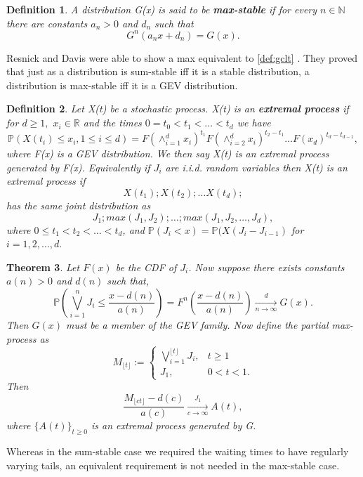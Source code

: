 \documentclass[honours,12pt]{UNSWthesis}
\newcommand{\R}{\mathbb{R}}
\newcommand{\N}{\mathbb{N}}
\newcommand{\PP}{\mathbb{P}}
\newcommand{\1}{\mathbf 1}
\newcommand{\Floor}[1]{{\lfloor {#1} \rfloor}}
\newtheorem{theorem}{Theorem}[section]
\newtheorem{definition}[theorem]{Definition}
\numberwithin{equation}{section}
\theoremstyle{definition}
\theoremstyle{remark}
\begin{document}
\begin{definition}\cite{BalkemaResnickMaxInfiniteDivisibility}
A distribution G(x) is said to be \textbf{max-stable} if for every $n\in\N$ there are constants $a_n>0$ and $d_n$ such that
\[
	G^n(a_n x + d_n)= G(x).
\]
\end{definition}

Resnick and Davis were able to show a max equivalent to \ref{def:gclt} \cite{TailEstimatesMotivatedByEVT}. They proved that just as a distribution is sum-stable iff it is a stable distribution, a distribution is max-stable iff it is a GEV distribution.

\begin{definition}
	Let X(t) be a stochastic process. X(t) is an \textbf{extremal process} if for $d\geq1,$ $x_i\in\R$ and the times $0=t_0<t_1<\ldots<t_d$ we have
	\[
	\PP(X(t_i)\leq x_i,1\leq i \leq d) = F(\wedge_{i=1}^d x_i)^{t_1} F(\wedge_{i=2}^d x_i)^{t_2-t_1}\ldots F(x_d)^{t_d-t_{d-1}},
	\]
	where F(x) is a GEV distribution. We then say X(t) is an extremal process generated by F(x). Equivalently if $J_i$ are i.i.d. random variables then X(t) is an extremal process if
	\[
		X(t_1) ;X(t_2); \ldots X(t_d);
	\]
	has the same joint distribution as 
	\[
		J_1;max(J_1,J_2);\ldots ;max(J_1,J_2,\ldots,J_d),
	\]
	where $0\leq t_1<t_2<\ldots<t_d$, and $\PP(J_i<x)=\PP(X(J_i-J_{i-1})$ for $i=1,2,\ldots,d.$
\end{definition}

\begin{theorem}\cite[Th~3.2]{Lamperti1964}%
Let $F(x)$ be the CDF of $J_i$. Now suppose there exists constants $a(n)>0$ and $d(n)$ such that,
\[
	\PP\left(\bigvee_{i=1}^n J_i\leq \frac{x-d(n)}{a(n)}\right)=F^n\left(\frac{x-d(n)}{a(n)}\right) \xrightarrow[n\to \infty]{d} G(x).
\]
Then $G(x)$ must be a member of the GEV family. Now define the partial max-process as
\[
	M_\Floor{t}:=
	\begin{cases}
	      \bigvee_{i=1}^{\lfloor{t}\rfloor} J_i, &\textrm{$t\geq 1$}\\
	         J_1, &\textrm{$0<t<1.$}
	\end{cases}
\]
Then 
\[
\frac{M_\Floor{ct}-d(c)}{a(c)} \xrightarrow[c\to \infty]{J_1} A(t),
\]
where $\{A(t)\}_{t\geq0}$ is an extremal process generated by G.
\end{theorem}
Whereas in the sum-stable case we required the waiting times to have regularly varying tails, an equivalent requirement is not needed in the max-stable case.
\end{document}
